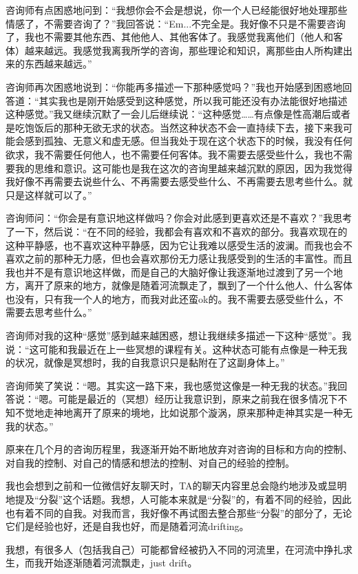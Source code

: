 咨询师有点困惑地问到：“我想你会不会是想说，你一个人已经能很好地处理那些情感了，不需要咨询了？”我回答说：“Em...不完全是。我好像不只是不需要咨询了，我也不需要其他东西、其他他人、其他客体了。我感觉我离他们（他人和客体）越来越远。我感觉我离我所学的咨询，那些理论和知识，离那些由人所构建出来的东西越来越远。”

咨询师再次困惑地说到：“你能再多描述一下那种感觉吗？”我也开始感到困惑地回答道：“其实我也是刚开始感受到这种感觉，所以我可能还没有办法能很好地描述这种感觉。”我又继续沉默了一会儿后继续说：“这种感觉……有点像是性高潮后或者是吃饱饭后的那种无欲无求的状态。当然这种状态不会一直持续下去，接下来我可能会感到孤独、无意义和虚无感。但当我处于现在这个状态下的时候，我没有任何欲求，我不需要任何他人，也不需要任何客体。我不需要去感受些什么，我也不需要我的思维和意识。这可能也是我在这次的咨询里越来越沉默的原因，因为我觉得我好像不再需要去说些什么、不再需要去感受些什么、不再需要去思考些什么。就只是这样就可以了。”

咨询师问：“你会是有意识地这样做吗？你会对此感到更喜欢还是不喜欢？”我思考了一下，然后说：“在不同的经验，我都会有喜欢和不喜欢的部分。我喜欢现在的这种平静感，也不喜欢这种平静感，因为它让我难以感受生活的波澜。而我也会不喜欢之前的那种无力感，但也会喜欢那份无力感让我感受到的生活的丰富性。而且我也并不是有意识地这样做，而是自己的大脑好像让我逐渐地过渡到了另一个地方，离开了原来的地方，就像是随着河流飘走了，飘到了一个什么他人、什么客体也没有，只有我一个人的地方，而我对此还蛮ok的。我不需要去感受些什么，不需要去思考些什么。”

咨询师对我的这种“感觉”感到越来越困惑，想让我继续多描述一下这种“感觉”。我说：“这可能和我最近在上一些冥想的课程有关。这种状态可能有点像是一种无我的状况，就像是冥想时，我的自我意识只是黏附在了这副身体上。”

咨询师笑了笑说：“嗯。其实这一路下来，我也感觉这像是一种无我的状态。”我回答说：“嗯。可能是最近的（冥想）经历让我意识到，原来之前我在很多情况下不知不觉地走神地离开了原来的境地，比如说那个漩涡，原来那种走神其实是一种无我的状态。”

原来在几个月的咨询历程里，我逐渐开始不断地放弃对咨询的目标和方向的控制、对自我的控制、对自己的情感和想法的控制、对自己的经验的控制。

我也会想到之前和一位微信好友聊天时，TA的聊天内容里总会隐约地涉及或显明地提及“分裂”这个话题。我想，人可能本来就是“分裂”的，有着不同的经验，因此也有着不同的自我。对我而言，我好像不再试图去整合那些“分裂”的部分了，无论它们是经验也好，还是自我也好，而是随着河流drifting。

我想，有很多人（包括我自己）可能都曾经被扔入不同的河流里，在河流中挣扎求生，而我开始逐渐随着河流飘走，just drift。

